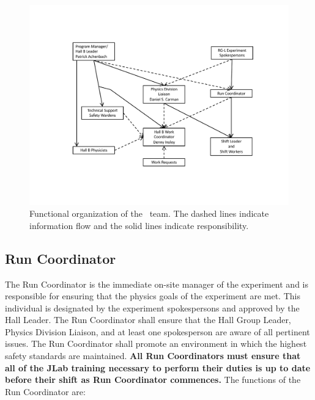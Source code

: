 \documentclass[11pt]{article}
\begin{document}
\begin{figure}
\includegraphics[width=\textwidth]{coo_HallB_CLAS12_rgl_org.pdf}
\caption{Functional organization of the \HALL\ team. The dashed
lines indicate information flow and the solid lines indicate responsibility.}
\label{HALLCHART}
\end{figure}


\subsection{Run Coordinator}
\indent

The Run Coordinator is the  immediate on-site manager of the experiment 
and is responsible for ensuring that the physics goals of the experiment 
are met. This individual is designated by the experiment spokespersons 
and approved by the Hall Leader.  The Run Coordinator shall ensure that 
the Hall Group Leader, Physics Division Liaison, and at least 
one spokesperson are aware of all pertinent issues. The Run Coordinator
shall promote an environment in which the highest safety
standards are maintained.
{\bf All Run Coordinators must ensure that all of the JLab training necessary to perform 
their duties is up to date before their shift as Run Coordinator commences.}
The functions of the Run Coordinator  are: 
\end{document}
